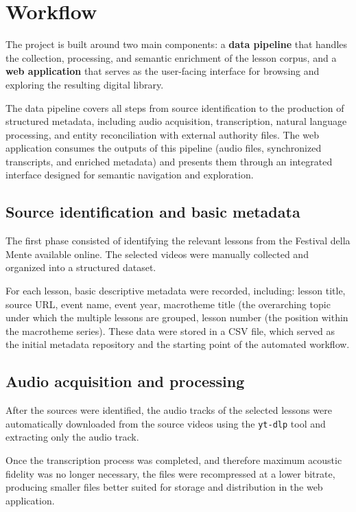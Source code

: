 \documentclass[11pt]{article}
\begin{document}
\section{Workflow}
The project is built around two main components: a \textbf{data pipeline} that handles the collection, processing, and semantic enrichment of the lesson corpus, and a \textbf{web application} that serves as the user-facing interface for browsing and exploring the resulting digital library. 

The data pipeline covers all steps from source identification to the production of structured metadata, including audio acquisition, transcription, natural language processing, and entity reconciliation with external authority files. The web application consumes the outputs of this pipeline (audio files, synchronized transcripts, and enriched metadata) and presents them through an integrated interface designed for semantic navigation and exploration.



\subsection{Source identification and basic metadata}
The first phase consisted of identifying the relevant lessons from the Festival della Mente available online. The selected videos were manually collected and organized into a structured dataset.

For each lesson, basic descriptive metadata were recorded, including: lesson title, source URL, event name, event year, macrotheme title (the overarching topic under which the multiple lessons are grouped, lesson number (the position within the macrotheme series). 
These data were stored in a CSV file, which served as the initial metadata repository and the starting point of the automated workflow.


\subsection{Audio acquisition and processing}
After the sources were identified, the audio tracks of the selected lessons were automatically downloaded from the source videos using the \texttt{yt-dlp} tool and extracting only the audio track.

Once the transcription process was completed, and therefore maximum acoustic fidelity was no longer necessary, the files were recompressed at a lower bitrate, producing smaller files better suited for storage and distribution in the web application.
\end{document}
